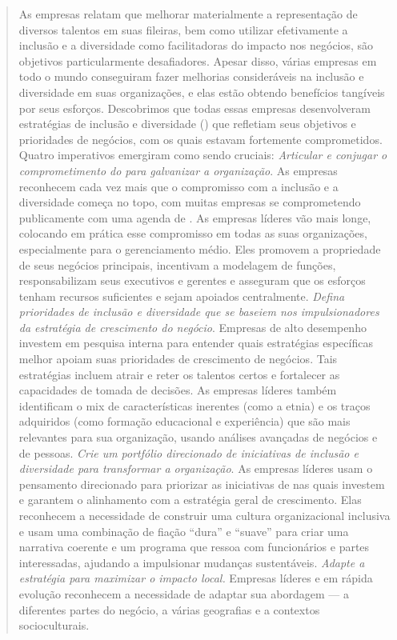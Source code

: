 \begin{quote}
As empresas relatam que melhorar materialmente a representação de
diversos talentos em suas fileiras, bem como utilizar efetivamente a
inclusão e a diversidade como facilitadoras do impacto nos negócios, são
objetivos particularmente desafiadores. Apesar disso, várias empresas em
todo o mundo conseguiram fazer melhorias consideráveis ​​na inclusão e
diversidade em suas organizações, e elas estão obtendo benefícios
tangíveis por seus esforços. Descobrimos que todas essas empresas
desenvolveram estratégias de inclusão e diversidade () que
refletiam seus objetivos e prioridades de negócios, com os quais estavam
fortemente comprometidos. Quatro imperativos emergiram como sendo
cruciais: \emph{Articular e conjugar o comprometimento do  para
galvanizar a organização}. As empresas reconhecem cada vez mais que o
compromisso com a inclusão e a diversidade começa no topo, com muitas
empresas se comprometendo publicamente com uma agenda de . As
empresas líderes vão mais longe, colocando em prática esse compromisso
em todas as suas organizações, especialmente para o gerenciamento médio.
Eles promovem a propriedade de seus negócios principais, incentivam a
modelagem de funções, responsabilizam seus executivos e gerentes e
asseguram que os esforços tenham recursos suficientes e sejam apoiados
centralmente. \emph{Defina prioridades de inclusão e diversidade que
se baseiem nos impulsionadores da estratégia de crescimento do negócio}.
Empresas de alto desempenho investem em pesquisa interna para entender
quais estratégias específicas melhor apoiam suas prioridades de
crescimento de negócios. Tais estratégias incluem atrair e reter os
talentos certos e fortalecer as capacidades de tomada de decisões. As
empresas líderes também identificam o mix de características inerentes
(como a etnia) e os traços adquiridos (como formação educacional e
experiência) que são mais relevantes para sua organização, usando
análises avançadas de negócios e de pessoas. \emph{Crie um portfólio
direcionado de iniciativas de inclusão e diversidade para transformar a
organização}. As empresas líderes usam o pensamento direcionado para
priorizar as iniciativas de  nas quais investem e garantem o
alinhamento com a estratégia geral de crescimento. Elas reconhecem a
necessidade de construir uma cultura organizacional inclusiva e usam uma
combinação de fiação ``dura'' e ``suave'' para criar uma narrativa
coerente e um programa que ressoa com funcionários e partes
interessadas, ajudando a impulsionar mudanças sustentáveis.
\emph{Adapte a estratégia para maximizar o impacto local.} Empresas
líderes e em rápida evolução reconhecem a necessidade de adaptar sua
abordagem --- a diferentes partes do negócio, a várias geografias e a
contextos socioculturais.
\end{quote}

